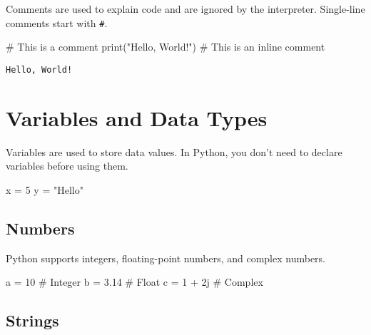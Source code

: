 \documentclass[
  letterpaper,
  DIV=11,
  numbers=noendperiod]{scrreprt}
\newenvironment{Shaded}{\begin{snugshade}}{\end{snugshade}}
\newcommand{\BuiltInTok}[1]{\textcolor[rgb]{0.00,0.23,0.31}{#1}}
\newcommand{\CommentTok}[1]{\textcolor[rgb]{0.37,0.37,0.37}{#1}}
\newcommand{\DecValTok}[1]{\textcolor[rgb]{0.68,0.00,0.00}{#1}}
\newcommand{\FloatTok}[1]{\textcolor[rgb]{0.68,0.00,0.00}{#1}}
\newcommand{\NormalTok}[1]{\textcolor[rgb]{0.00,0.23,0.31}{#1}}
\newcommand{\OperatorTok}[1]{\textcolor[rgb]{0.37,0.37,0.37}{#1}}
\newcommand{\OtherTok}[1]{\textcolor[rgb]{0.00,0.23,0.31}{#1}}
\newcommand{\StringTok}[1]{\textcolor[rgb]{0.13,0.47,0.30}{#1}}
\begin{document}
Comments are used to explain code and are ignored by the interpreter.
Single-line comments start with \texttt{\#}.

\begin{Shaded}
\begin{Highlighting}[]
\CommentTok{\# This is a comment}
\BuiltInTok{print}\NormalTok{(}\StringTok{"Hello, World!"}\NormalTok{)  }\CommentTok{\# This is an inline comment}
\end{Highlighting}
\end{Shaded}

\begin{verbatim}
Hello, World!
\end{verbatim}

\section{Variables and Data Types}\label{variables-and-data-types-1}

Variables are used to store data values. In Python, you don't need to
declare variables before using them.

\begin{Shaded}
\begin{Highlighting}[]
\NormalTok{x }\OperatorTok{=} \DecValTok{5}
\NormalTok{y }\OperatorTok{=} \StringTok{"Hello"}
\end{Highlighting}
\end{Shaded}

\subsection{Numbers}\label{numbers}

Python supports integers, floating-point numbers, and complex numbers.

\begin{Shaded}
\begin{Highlighting}[]
\NormalTok{a }\OperatorTok{=} \DecValTok{10}       \CommentTok{\# Integer}
\NormalTok{b }\OperatorTok{=} \FloatTok{3.14}     \CommentTok{\# Float}
\NormalTok{c }\OperatorTok{=} \DecValTok{1} \OperatorTok{+} \OtherTok{2j}   \CommentTok{\# Complex}
\end{Highlighting}
\end{Shaded}

\subsection{Strings}\label{strings}
\end{document}
